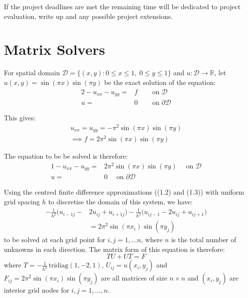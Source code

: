 \documentclass{article}
\numberwithin{equation}{section}
\begin{document}
If the project deadlines are met the remaining time will be dedicated to project evaluation, write up and any possible project extensions.

\newpage

\section{Matrix Solvers}
For spatial domain $\mathcal{D} = \{(x,y) : 0 \leq x \leq 1, \; 0 \leq y \leq 1 \}$ and $u: \mathcal{D} \rightarrow \mathbb{R}$, let $u(x,y) = \sin{(\pi x)} \sin{(\pi y)}$ be the exact solution of the equation:
\begin{alignat}{2}
-u_{xx} -u_{yy} = {} & f \quad & \text{ on } \mathcal{D} \nonumber \\
u = {} & 0 \quad & \text{ on } \partial \mathcal{D}
\end{alignat}

This gives:
\begin{equation}
\begin{split}
u_{xx} = u_{yy} = - \pi^2 \sin{(\pi x)} \sin{(\pi y)} \\
\implies f = 2 \pi^2 \sin{(\pi x)} \sin {(\pi y)}
\end{split}
\end{equation} 

The equation to be be solved is therefore:
\begin{alignat}{1}
-u_{xx} -u_{yy} = {} & 2 \pi^2 \sin{(\pi x)} \sin {(\pi y)} \quad \text{ on } \mathcal{D} \nonumber \\
u = {} & 0 \quad \text{ on } \partial \mathcal{D}
\end{alignat}

Using the centred finite difference approximations ((1.2) and (1.3)) with uniform grid spacing $h$ to discretise the domain of this system, we have:
	\begin{equation}
	\begin{split}
	-\frac{1}{h^2} \big( u_{i-1j} - & 2u_{ij} + u_{i+1j} \big) - \frac{1}{h^2} \big( u_{ij-1} - 2u_{ij} + u_{ij+1} \big) 
	\\ & = 2\pi^2 \sin(\pi x_i) \sin(\pi y_j)
	\end{split}
	\end{equation}
to be solved at each grid point for $i, j = 1, \dots n$, where $n$ is the total number of unknowns in each direction. The matrix form of this equation is therefore:
\begin{equation}
	TU + UT = F
	\end{equation}
where $T=-\frac{1}{h^2} \, \text{tridiag}(1,-2,1)$, $U_{ij} = u(x_i, y_j)$ and $F_{ij} = 2 \pi^2 \sin(\pi x_i) \sin(\pi y_j)$ are all matrices of size $n \times n$ and $(x_i, y_j)$ are interior grid nodes for $i,j=1,\dots,n$.
\end{document}
